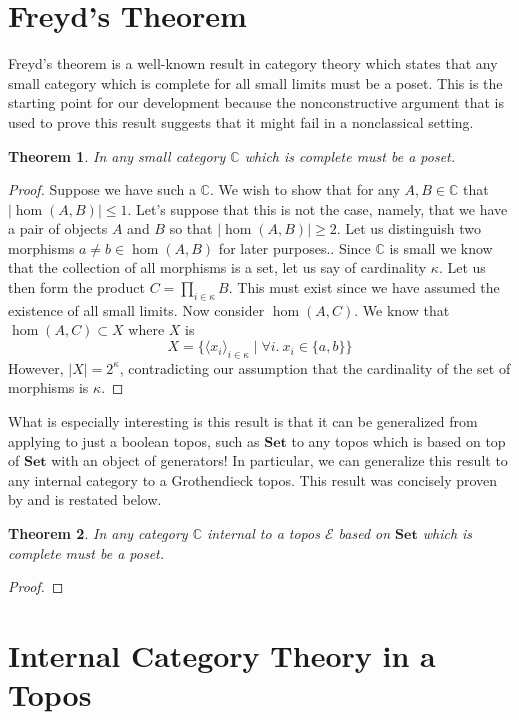 \documentclass[12pt]{amsart}
\newcommand{\todo}[1]{{\color{red}{\LARGE #1}}}
\newcommand{\cat}[1]{\ensuremath{\mathbf{#1}}}
\newcommand{\set}{\cat{Set}}
\newcommand{\Ccat}{\ensuremath{\mathbb{C}}}
\newcommand{\Etop}{\ensuremath{\mathcal{E}}}
\newcommand{\card}[1]{\ensuremath{\left\vert#1\right\vert}}
\newtheorem{thm}{Theorem}[section]
\begin{document}
\section{Freyd's Theorem}\label{sec:freyd}

Freyd's theorem is a well-known result in category theory which states
that any small category which is complete for all small limits must be
a poset. This is the starting point for our development because the
nonconstructive argument that is used to prove this result suggests
that it might fail in a nonclassical setting.
\begin{thm}\label{thm:freyd:freyd}
  In any small category $\Ccat$ which is complete must be a poset.
\end{thm}
\begin{proof}
  Suppose we have such a $\Ccat$. We wish to show that for any
  $A, B \in \Ccat$ that $\card{\hom(A, B)} \le 1$. Let's suppose that
  this is not the case, namely, that we have a pair of objects $A$ and
  $B$ so that $\card{\hom(A, B)} \ge 2$. Let us distinguish two
  morphisms $a \neq b \in \hom(A, B)$ for later purposes.. Since
  $\Ccat$ is small we know that the collection of all morphisms is a
  set, let us say of cardinality $\kappa$. Let us then form the
  product $C = \prod_{i \in \kappa} B$. This must exist since we have
  assumed the existence of all small limits. Now consider
  $\hom(A, C)$. We know that $\hom(A, C) \subset X$ where $X$ is
  \[
    X = \{\langle x_i \rangle_{i \in \kappa}\mid \forall i.\ x_i \in \{a, b\}\}
  \]
  However, $\card{X} = 2^\kappa$, contradicting our assumption that
  the cardinality of the set of morphisms is $\kappa$.
\end{proof}

What is especially interesting is this result is that it can be
generalized from applying to just a boolean topos, such as $\set$ to
any topos which is based on top of $\set$ with an object of
generators! In particular, we can generalize this result to any
internal category to a Grothendieck topos. This result was concisely
proven by \citet{Gubkin:10} and is restated below.
\begin{thm}\label{thm:freyd:grothendieck}
  In any category $\Ccat$ internal to a topos $\Etop$ based on $\set$
  which is complete must be a poset.
\end{thm}
\begin{proof}
  \todo{Reprove this}
\end{proof}

\section{Internal Category Theory in a Topos}\label{sec:internal}
\end{document}
